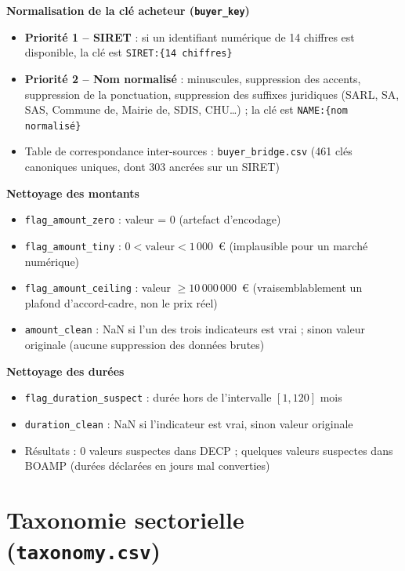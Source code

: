 \documentclass[12pt,a4paper]{article}
\begin{document}
\textbf{Normalisation de la clé acheteur (\texttt{buyer\_key})}

\begin{itemize}
  \item[---] \textbf{Priorité 1 -- SIRET} : si un identifiant numérique de
    14 chiffres est disponible, la clé est \texttt{SIRET:\{14 chiffres\}}
  \item[---] \textbf{Priorité 2 -- Nom normalisé} : minuscules, suppression
    des accents, suppression de la ponctuation, suppression des suffixes
    juridiques (SARL, SA, SAS, Commune de, Mairie de, SDIS, CHU\ldots) ;
    la clé est \texttt{NAME:\{nom normalisé\}}
  \item[---] Table de correspondance inter-sources : \texttt{buyer\_bridge.csv}
    (461 clés canoniques uniques, dont 303 ancrées sur un SIRET)
\end{itemize}

\medskip
\textbf{Nettoyage des montants}

\begin{itemize}
  \item[---] \texttt{flag\_amount\_zero} : valeur = 0 (artefact d'encodage)
  \item[---] \texttt{flag\_amount\_tiny} : $0 < \text{valeur} < 1\,000$~€
    (implausible pour un marché numérique)
  \item[---] \texttt{flag\_amount\_ceiling} : valeur $\geq 10\,000\,000$~€
    (vraisemblablement un plafond d'accord-cadre, non le prix réel)
  \item[---] \texttt{amount\_clean} : NaN si l'un des trois indicateurs est
    vrai ; sinon valeur originale (aucune suppression des données brutes)
\end{itemize}

\medskip
\textbf{Nettoyage des durées}

\begin{itemize}
  \item[---] \texttt{flag\_duration\_suspect} : durée hors de l'intervalle
    $[1, 120]$ mois
  \item[---] \texttt{duration\_clean} : NaN si l'indicateur est vrai, sinon
    valeur originale
  \item[---] Résultats : 0 valeurs suspectes dans DECP ; quelques valeurs
    suspectes dans BOAMP (durées déclarées en jours mal converties)
\end{itemize}

\section{Taxonomie sectorielle (\texttt{taxonomy.csv})}
\label{sec:taxonomy}
\end{document}
